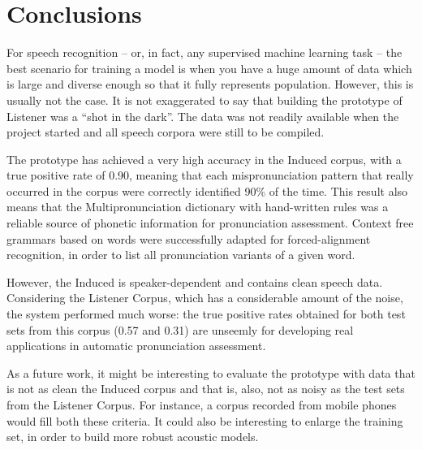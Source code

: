 \documentclass[twocolumn]{bmcart}%
\begin{document}
\section*{Conclusions}

For speech recognition -- or, in fact, any supervised  machine learning task -- the best
scenario for training a model is when you have a huge amount of data which is large and
diverse enough so that it fully represents population. However, this is usually not the case. 
It is not exaggerated to say that building the prototype of Listener was a ``shot in the dark''.
The data was not readily available when the project started and all speech corpora were still to be compiled. 

The prototype has achieved a very high accuracy in the Induced corpus, with a true positive rate of 0.90, meaning that each mispronunciation pattern that really occurred in the corpus were correctly identified 90\% of the time. This result also means that the Multipronunciation dictionary with hand-written rules was a reliable source of phonetic information for pronunciation assessment. Context free grammars based on words were successfully adapted for forced-alignment recognition, in order to list all pronunciation variants of a given word.

However, the Induced is speaker-dependent and contains clean speech data. Considering the Listener Corpus, which has a considerable amount of the noise, the system performed much worse: the true positive rates obtained for both test sets from this corpus (0.57 and 0.31) are unseemly for developing real applications in automatic pronunciation assessment. 

As a future work, it might be interesting to evaluate the prototype with data that is not as clean the Induced corpus and that is, also, not as noisy as the test sets from the Listener Corpus. For instance, a corpus recorded from mobile phones would fill both these criteria. It could also be interesting to enlarge the training set, in order to build more robust acoustic models.

\end{document}
